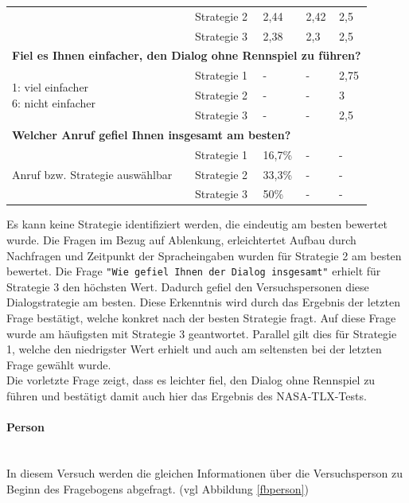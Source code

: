 \documentclass[12pt,a4paper]{scrartcl}
\begin{document}
\begin{longtable}{|p{4cm}|p{2cm}|p{2cm}|p{2cm}|p{2cm}|}
 & Strategie 2 & 2,44 & 2,42 & 2,5 \\
 & Strategie 3 & 2,38 & 2,3 & 2,5 \\
\hline
		\multicolumn{5}{l}{\textbf{Fiel es Ihnen einfacher, den Dialog ohne Rennspiel zu führen?}}\\
		\hline
\multirow{3}{4cm}{1: viel einfacher \newline  6: nicht einfacher} & Strategie 1 & - & - & 2,75 \\
- & Strategie 2 & - & - & 3 \\
- & Strategie 3 & - & - & 2,5\\
\hline
		\multicolumn{5}{l}{\textbf{Welcher Anruf gefiel Ihnen insgesamt am besten?}}\\
		\hline
\multirow{3}{4cm}{Anruf bzw. Strategie auswählbar} & Strategie 1 & 16,7\% &-  &-  \\
 & Strategie 2 & 33,3\% & - & - \\
 & Strategie 3 & 50\% & - &  -\\
\hline
\end{longtable}

Es kann keine Strategie identifiziert werden, die eindeutig am besten bewertet wurde. 
Die Fragen im Bezug auf Ablenkung, erleichtertet Aufbau durch Nachfragen und Zeitpunkt der Spracheingaben wurden für Strategie 2 am besten bewertet.
Die Frage \texttt{"Wie gefiel Ihnen der Dialog insgesamt"} erhielt für Strategie 3 den höchsten Wert. Dadurch gefiel den Versuchspersonen diese Dialogstrategie am besten. Diese Erkenntnis wird durch das Ergebnis der letzten Frage bestätigt, welche konkret nach der besten Strategie fragt. Auf diese Frage wurde am häufigsten mit Strategie 3 geantwortet. Parallel gilt dies für Strategie 1, welche den niedrigster Wert erhielt und auch am seltensten bei der letzten Frage gewählt wurde. \\

Die vorletzte Frage zeigt, dass es leichter fiel, den Dialog ohne Rennspiel zu führen und bestätigt damit auch hier das Ergebnis des NASA-TLX-Tests.

\paragraph{Person}
\label{fbperson2}
~\\
In diesem Versuch werden die gleichen Informationen über die Versuchsperson zu Beginn des Fragebogens abgefragt. (vgl Abbildung \ref{fbperson})\\
\end{document}
